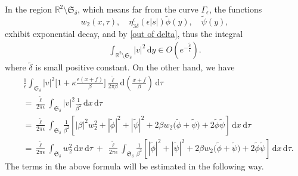 \documentclass[10pt, reqno]{amsart}
\numberwithin{equation}{section}
\theoremstyle{definition}
\def\G{{\mathfrak G}}
\def\G{\Gamma}
\begin{document}
{In the region ${\mathbb R}^2\setminus{\mathfrak S}_\delta$, which means far from the curve $\G_\epsilon$, the functions
\[ w_2(x, \tau), \quad \eta_{3\delta}^{\epsilon}(\epsilon |s|){\tilde\phi}(y), \quad {\tilde\psi}(y), \]
exhibit exponential decay, and by \eqref{out of delta}, thus the integral
\begin{align}
 \int_{{\mathbb R}^2\setminus{\mathfrak S}_\delta} |v|^2\,{\mathrm d}y \in O\left(e^{-\frac{\tilde \delta}\epsilon} \right).
\label{estimate1}
\end{align}
where $\tilde \delta$ is small positive constant.
On the other hand, we have
\begin{align}
 & \frac1\epsilon\int_{{\mathfrak S}_\delta} |v|^2 \Bigg[1+ \kappa \frac{\epsilon (x+f)} {\beta} \Bigg] \frac {\tilde \ell} {2\pi \beta}{\mathrm d} \left(\frac{ x+f} {\beta}\right)\,{\mathrm d}\tau
\nonumber\\[2mm]
 &
 = \frac {\tilde \ell} {2\pi \epsilon} \int_{{\mathfrak S}_\delta} |v|^2 \frac {1} {\beta^2}\, {\mathrm d} x \,{\mathrm d}\tau
\nonumber\\[2mm]
 &
 = \frac {\tilde \ell} {2\pi \epsilon} \int_{{\mathfrak S}_\delta} \frac {1} {\beta^2} \left[ |\beta|^2 w_2^2+ |{\tilde\phi}|^2+ |{\tilde\psi}|^2 + 2\beta w_2 \big( {\tilde\phi} + {\tilde\psi} \big) + 2 \tilde \phi\tilde \psi \right] \, {\mathrm d} x \,{\mathrm d}\tau
\nonumber\\[2mm]
 &
 = \frac {\tilde \ell} {2\pi \epsilon} \int_{{\mathfrak S}_\delta} w_2^2 \, {\mathrm d} x \,{\mathrm d}\tau
\ +\
\frac {\tilde \ell} {2\pi \epsilon} \int_{{\mathfrak S}_\delta} \frac {1} {\beta^2} \left[ |{\tilde\phi}|^2+ |{\tilde\psi}|^2 + 2\beta w_2 \big( {\tilde\phi} + {\tilde\psi} \big) + 2 \tilde \phi\tilde \psi \right] \, {\mathrm d} x \,{\mathrm d}\tau.
\label{estimate2}
\end{align}
The terms in the above formula will be estimated in the following way.

}
\end{document}
